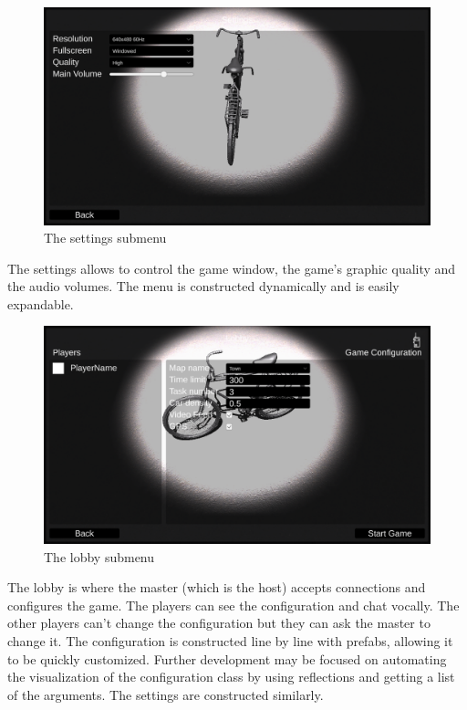 \documentclass[12pt]{article}
\begin{document}
\begin{figure}[H]
\includegraphics[width=\textwidth]{settings}
\caption{The settings submenu}
\end{figure}
The settings allows to control the game window, the game's graphic quality and the audio volumes. The menu is constructed dynamically and is easily expandable.
\begin{figure}[H]
\includegraphics[width=\textwidth]{lobby}
\caption{The lobby submenu}
\end{figure}
The lobby is where the master (which is the host) accepts connections and configures the game. The players can see the configuration and chat vocally. The other players can't change the configuration but they can ask the master to change it. The configuration is constructed line by line with prefabs, allowing it to be quickly customized. Further development may be focused on automating the visualization of the configuration class by using reflections and getting a list of the arguments. The settings are constructed similarly.
\end{document}
